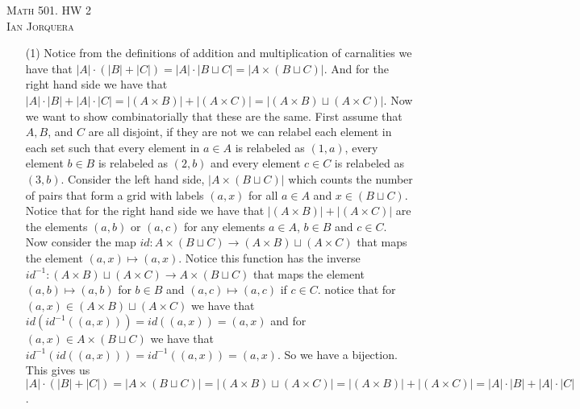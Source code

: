 \documentclass[12pt]{amsart}
\theoremstyle{definition}
\newcommand{\ra}{\rightarrow}
\begin{document}
\begin{center}
    \textsc{Math 501. HW 2\\ Ian Jorquera}
\end{center}
\vspace{1em}


\begin{itemize}
\item[(1)] %
Notice from the definitions of addition and multiplication of carnalities we have that $|A|\cdot(|B|+|C|)= |A|\cdot|B\sqcup C|=|A\times(B\sqcup C)|$. And for the right hand side we have that $|A|\cdot |B|+|A|\cdot |C|=|(A\times B)|+|(A\times C)|=|(A\times B)\sqcup (A\times C)|$. Now we want to show combinatorially that these are the same. First assume that $A, B$, and $C$ are all disjoint, if they are not we can relabel each element in each set such that every element in $a\in A$ is relabeled as $(1,a)$, every element $b\in B$ is relabeled as $(2,b)$ and every element $c\in C$ is relabeled as $(3,b)$. Consider the left hand side, $|A\times(B\sqcup C)|$ which counts the number of pairs that form a grid with labels $(a,x)$ for all $a\in A$ and $x\in (B\sqcup C)$. Notice that for the right hand side we have that $|(A\times B)|+|(A\times C)|$ are the elements $(a,b)$ or $(a,c)$ for any elements $a\in A$, $b\in B$ and $c\in C$.\\

Now consider the map $id:A\times(B\sqcup C)\ra (A\times B)\sqcup (A\times C)$ that maps the element $(a,x)\mapsto (a,x)$. Notice this function has the inverse $id^{-1}:(A\times B)\sqcup (A\times C)\ra A\times(B\sqcup C)$ that maps the element $(a,b)\mapsto (a,b)$ for $b\in B$ and $(a,c)\mapsto (a,c)$ if $c\in C$. notice that for $(a,x)\in (A\times B)\sqcup (A\times C)$ we have that $id(id^{-1}((a,x)))=id((a,x))=(a,x)$ and for $(a,x)\in A\times(B\sqcup C)$ we have that $id^{-1}(id((a,x)))=id^{-1}((a,x))=(a,x)$. So we have a bijection. This gives us $|A|\cdot(|B|+|C|)=|A\times(B\sqcup C)|=|(A\times B)\sqcup (A\times C)|=|(A\times B)|+|(A\times C)|=|A|\cdot |B|+|A|\cdot |C|$.\\


\end{itemize}
\end{document}

